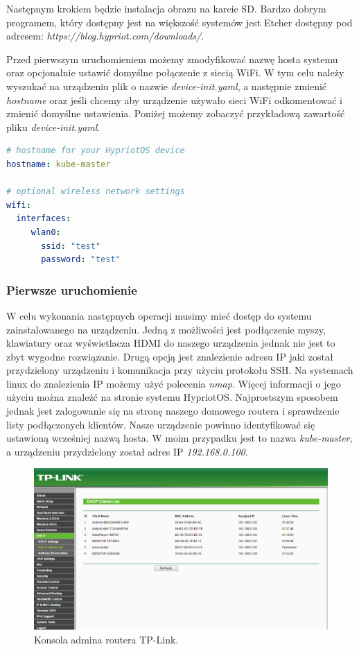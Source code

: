 \documentclass[12pt]{report}
\let\Oldsubsubsection\subsubsection
\renewcommand{\subsubsection}{\FloatBarrier\Oldsubsubsection}
\begin{document}
{Następnym krokiem będzie instalacja obrazu na karcie SD. Bardzo dobrym programem, który dostępny jest na większość systemów jest Etcher dostępny pod adresem: \textit{https://blog.hypriot.com/downloads/}.

Przed pierwszym uruchomieniem możemy zmodyfikować nazwę hosta systemu oraz opcjonalnie ustawić domyślne połączenie z siecią WiFi. W tym celu należy wyszukać na urządzeniu plik o nazwie \textit{device-init.yaml}, a następnie zmienić \textit{hostname} oraz jeśli chcemy aby urządzenie używało sieci WiFi odkomentować i zmienić domyślne ustawienia. Poniżej możemy zobaczyć przykładową zawartość pliku \textit{device-init.yaml}.

\begin{lstlisting}[language=yaml]
# hostname for your HypriotOS device
hostname: kube-master

# optional wireless network settings
wifi:
  interfaces:
     wlan0:
       ssid: "test"
       password: "test"
\end{lstlisting}

\subsubsection{Pierwsze uruchomienie}
W celu wykonania następnych operacji musimy mieć dostęp do systemu zainstalowanego na urządzeniu. Jedną z możliwości jest podłączenie myszy, klawiatury oraz wyświetlacza HDMI do naszego urządzenia jednak nie jest to zbyt wygodne rozwiązanie. Drugą opcją jest znalezienie adresu IP jaki został przydzielony urządzeniu i komunikacja przy użyciu protokołu SSH. Na systemach linux do znalezienia IP możemy użyć polecenia \textit{nmap}. Więcej informacji o jego użyciu można znaleźć na stronie systemu HypriotOS. Najprostszym sposobem jednak jest zalogowanie się na stronę naszego domowego routera i sprawdzenie listy podłączonych klientów. Nasze urządzenie powinno identyfikować się ustawioną wcześniej nazwą hosta. W moim przypadku jest to nazwa \textit{kube-master}, a urządzeniu przydzielony został adres IP \textit{192.168.0.100}.

\begin{figure}[h]
	\centering
	\includegraphics[width=1\textwidth]{images/tp-link-console.png}
	\caption{Konsola admina routera TP-Link.}
\end{figure}
\FloatBarrier

}
\end{document}
